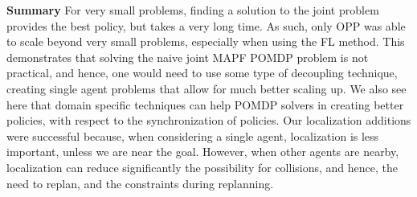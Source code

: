 \documentclass[letterpaper]{article} %
\begin{document}
\noindent\textbf{Summary} For very small problems, finding a solution to the joint problem provides the best policy, but takes a very long time. As such, only OPP was able to scale beyond very small problems, especially when using the FL method. This demonstrates that solving the naive joint MAPF POMDP problem is not practical, and hence, one would need to use some type of decoupling technique, creating single agent problems that allow for much better scaling up.
We also see here that domain specific techniques can help POMDP solvers in creating better policies, with respect to the synchronization of policies. Our localization additions were successful because, when considering a single agent, localization is less important, unless we are near the goal. However, when other agents are nearby, localization can reduce significantly the possibility for collisions, and hence, the need to replan, and the constraints during replanning.
\end{document}
